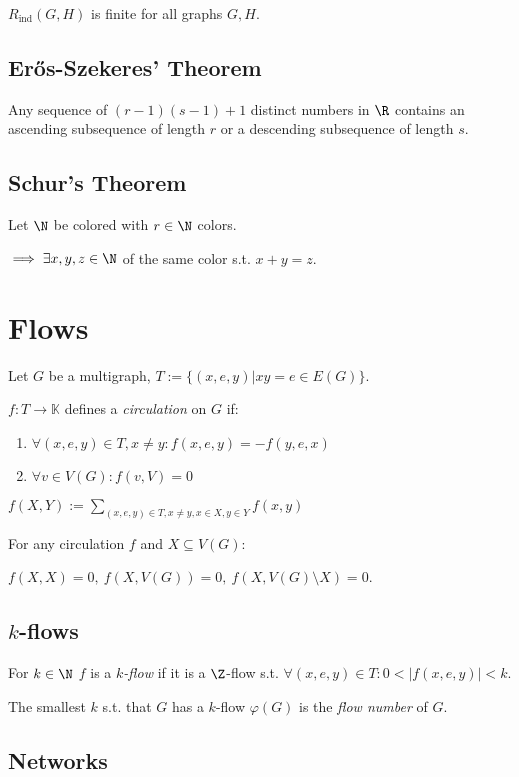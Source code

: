 $R_\text{ind}(G,H)$ is finite for all graphs $G, H$.

\subsection*{Er\H{o}s-Szekeres' Theorem}

Any sequence of $(r-1)(s-1)+1$ distinct numbers in $\R$ contains an ascending subsequence of length $r$ or a descending subsequence of length $s$.

\subsection*{Schur's Theorem}

Let $\N$ be colored with $r \in \N$ colors.

$\implies \exists x, y, z \in \N$ of the same color s.t. $x+y=z$.

\section*{Flows}

Let $G$ be a multigraph, $T := \{(x,e,y) | xy = e \in E(G)\}$.

$f : T \to \mathbb{K}$ defines a \emph{circulation} on $G$ if:

\begin{enumerate}
	\item $\forall (x,e,y) \in T, x \neq y : f(x,e,y) = -f(y,e,x)$
	\item $\forall v \in V(G) : f(v,V) = 0$
\end{enumerate}

$f(X,Y) := \displaystyle\sum_{(x,e,y) \in T, x \neq y, x \in X, y \in Y} f(x,y)$

For any circulation $f$ and $X \subseteq V(G)$:

$f(X,X)=0, \ f(X,V(G))=0, \ f(X,V(G) \setminus X)=0$.

\subsection*{$k$-flows}

For $k \in \N$ $f$ is a \emph{$k$-flow} if it is a $\Z$-flow s.t. $\forall (x,e,y) \in T : 0 < |f(x,e,y)| < k$.

\spacing

The smallest $k$ s.t. that $G$ has a $k$-flow $\varphi(G)$ is the \emph{flow number} of $G$.

\subsection*{Networks}

